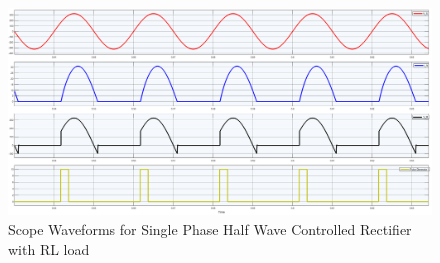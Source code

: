 \begin{figure}[h]
    \centering
    \includegraphics[width=1\textwidth]{images/experiment-1/circuit-scope-simulation-06.png}
    \caption{Scope Waveforms for Single Phase Half Wave Controlled Rectifier with RL load}
    \label{Fig_waveform_single-phase-half-wave-controlled-rectifier-with-RL-load}
\end{figure}

\pagebreak
